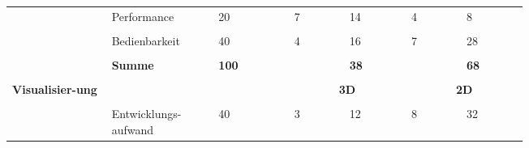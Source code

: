 \documentclass[main.tex]{subfiles} %
\begin{document}
\begin{table}[ht]
\begin{tabular}{|p{0.14\linewidth}|p{0.15\linewidth}|p{0.115\linewidth}|p{0.08\linewidth}|p{0.09\linewidth}|p{0.08\linewidth}|p{0.09\linewidth}|}
                                                           & Performance                         & 20                                           & 7                                              & 14          & 4          & 8           \\[1pt]
        \cline{2-7}
                                                           &                                     &                                              &                                                &             &            &             \\[-9pt]
                                                           & Bedienbarkeit                       & 40                                           & 4                                              & 16          & 7          & 28          \\[1pt]
        \cline{2-7}
                                                           &                                     &                                              &                                                &             &            &             \\[-9pt]
                                                           & \textbf{Summe}                      & \textbf{100}                                 &                                                & \textbf{38} &            & \textbf{68} \\[1pt]
        \hline
        \hline
                                                           & \multicolumn{2}{c|}{}               & \multicolumn{2}{c|}{}                        & \multicolumn{2}{c|}{}                                                                   \\[-9pt]
        \multirow{6}{4em}{\textbf{Visualisier-ung}}        & \multicolumn{2}{c|}{}               & \multicolumn{2}{c|}{\textbf{3D}}             & \multicolumn{2}{c|}{\textbf{2D}}                                                        \\[1pt]
        \cline{2-7}
                                                           &                                     &                                              &                                                &             &            &             \\[-9pt]
                                                           & Entwicklungs-aufwand                & 40                                           & 3                                              & 12          & 8          & 32          \\[1pt]

\end{tabular}
\end{table}
\end{document}
